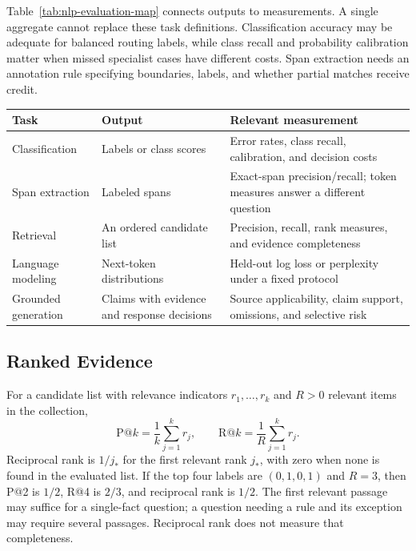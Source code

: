 Table~\ref{tab:nlp-evaluation-map} connects outputs to measurements. A single aggregate cannot replace these task definitions. Classification accuracy may be adequate for balanced routing labels, while class recall and probability calibration matter when missed specialist cases have different costs. Span extraction needs an annotation rule specifying boundaries, labels, and whether partial matches receive credit.

\par\addvspace{\intextsep}\noindent\begin{minipage}{\linewidth}
\centering
\setlength{\tabcolsep}{3pt}
\renewcommand{\arraystretch}{1.12}
\begin{tabular}{@{}>{\raggedright\arraybackslash}p{2.2cm}>{\raggedright\arraybackslash}p{3.15cm}>{\raggedright\arraybackslash}p{4.65cm}@{}}
\toprule
Task & Output & Relevant measurement \\
\midrule
Classification & Labels or class scores & Error rates, class recall, calibration, and decision costs \\
Span extraction & Labeled spans & Exact-span precision/recall; token measures answer a different question \\
Retrieval & An ordered candidate list & Precision, recall, rank measures, and evidence completeness \\
Language modeling & Next-token distributions & Held-out log loss or perplexity under a fixed protocol \\
Grounded generation & Claims with evidence and response decisions & Source applicability, claim support, omissions, and selective risk \\
\bottomrule
\end{tabular}
\label{tab:nlp-evaluation-map}
\end{minipage}\par\addvspace{\intextsep}

\subsection{Ranked Evidence}

For a candidate list with relevance indicators $r_1,\ldots,r_k$ and $R>0$ relevant items in the collection,
\[
 \mathrm{P@}k=\frac1k\sum_{j=1}^{k}r_j,\qquad
 \mathrm{R@}k=\frac1R\sum_{j=1}^{k}r_j.
\]
Reciprocal rank is $1/j_*$ for the first relevant rank $j_*$, with zero when none is found in the evaluated list. If the top four labels are $(0,1,0,1)$ and $R=3$, then P@2 is $1/2$, R@4 is $2/3$, and reciprocal rank is $1/2$. The first relevant passage may suffice for a single-fact question; a question needing a rule and its exception may require several passages. Reciprocal rank does not measure that completeness.

